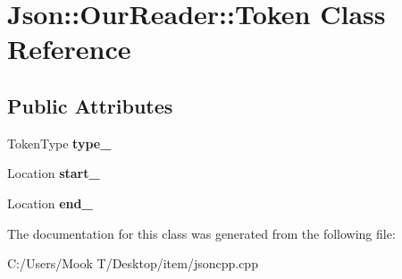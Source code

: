\hypertarget{class_json_1_1_our_reader_1_1_token}{}\section{Json\+:\+:Our\+Reader\+:\+:Token Class Reference}
\label{class_json_1_1_our_reader_1_1_token}
\subsection*{Public Attributes}
\begin{DoxyCompactItemize}
\item 
\hypertarget{class_json_1_1_our_reader_1_1_token_abe7d858530396fa7e1293f7a579880ed}{}Token\+Type {\bfseries type\+\_\+}\label{class_json_1_1_our_reader_1_1_token_abe7d858530396fa7e1293f7a579880ed}

\item 
\hypertarget{class_json_1_1_our_reader_1_1_token_aedf68bb00eaaa9d3c22b9825999602ac}{}Location {\bfseries start\+\_\+}\label{class_json_1_1_our_reader_1_1_token_aedf68bb00eaaa9d3c22b9825999602ac}

\item 
\hypertarget{class_json_1_1_our_reader_1_1_token_a67d2071638add857528579ae3791eccc}{}Location {\bfseries end\+\_\+}\label{class_json_1_1_our_reader_1_1_token_a67d2071638add857528579ae3791eccc}

\end{DoxyCompactItemize}


The documentation for this class was generated from the following file\+:\begin{DoxyCompactItemize}
\item 
C\+:/\+Users/\+Mook T/\+Desktop/item/jsoncpp.\+cpp\end{DoxyCompactItemize}
